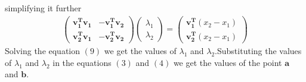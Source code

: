 \documentclass[journal,12pt,twocolumn]{IEEEtran}
\begin{document}
simplifying it further\\
\begin{align}
    \begin{pmatrix}\bm{v_1^T}\bm{v_1} & -\bm{v_1^T}\bm{v_2}\\\bm{v_2^T}\bm{v_1} &  -\bm{v_2^T}\bm{v_2}\end{pmatrix}\begin{pmatrix}\lambda_1\\\lambda_2\end{pmatrix}=\begin{pmatrix}\bm{v_1^T}(x_2-x_1)\\\bm{v_2^T}(x_2-x_1)\end{pmatrix}
\end{align}
Solving the equation $(9)$ we get the values of $\lambda_1$ and $\lambda_2$.Substituting the values of $\lambda_1$ and $\lambda_2$ in the equations $(3)$ and $(4)$ we get the values of the point $\bm{a}$ and $\bm{b}$.
\end{document}
